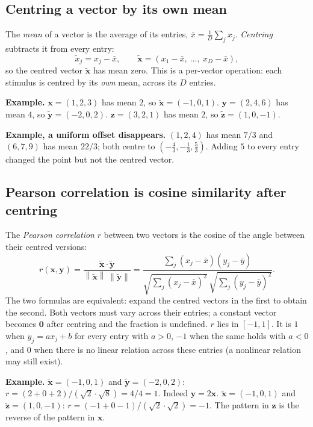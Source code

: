 \documentclass[11pt]{article}
\newcommand{\vx}{\bm{x}}
\newcommand{\vy}{\bm{y}}
\newcommand{\norm}[1]{\left\lVert #1 \right\rVert}
\begin{document}
\subsection{Centring a vector by its own mean}

The \emph{mean} of a vector is the average of its entries, $\bar{x} = \frac{1}{D}\sum_j x_j$.
\emph{Centring} subtracts it from every entry:
\[
\tilde{x}_j = x_j - \bar{x}, \qquad
\tilde{\vx} = (x_1 - \bar{x},\ \dots,\ x_D - \bar{x}) ,
\]
so the centred vector $\tilde{\vx}$ has mean zero. This is a per-vector operation: each
stimulus is centred by its \emph{own} mean, across its $D$ entries.

\textbf{Example.} $\vx = (1, 2, 3)$ has mean $2$, so $\tilde{\vx} = (-1, 0, 1)$.
$\vy = (2, 4, 6)$ has mean $4$, so $\tilde{\vy} = (-2, 0, 2)$.
$\bm{z} = (3, 2, 1)$ has mean $2$, so $\tilde{\bm{z}} = (1, 0, -1)$.

\textbf{Example, a uniform offset disappears.} $(1, 2, 4)$ has mean $7/3$ and
$(6, 7, 9)$ has mean $22/3$; both centre to $(-\tfrac43, -\tfrac13, \tfrac53)$. Adding
$5$ to every entry changed the point but not the centred vector.

\subsection{Pearson correlation is cosine similarity after centring}

The \emph{Pearson correlation} $r$ between two vectors is the cosine of the angle between
their centred versions:
\[
r(\vx, \vy) = \frac{\tilde{\vx} \cdot \tilde{\vy}}{\norm{\tilde{\vx}}\,\norm{\tilde{\vy}}}
= \frac{\sum_j (x_j - \bar{x})(y_j - \bar{y})}
       {\sqrt{\sum_j (x_j - \bar{x})^2}\,\sqrt{\sum_j (y_j - \bar{y})^2}} .
\]
The two formulas are equivalent: expand the centred vectors in the first to obtain the
second. Both vectors must vary across their entries; a constant vector becomes $\bm{0}$
after centring and the fraction is undefined. $r$ lies in $[-1, 1]$. It is $1$ when
$y_j = a x_j + b$ for every entry with $a > 0$, $-1$ when the same holds with $a < 0$, and
$0$ when there is no linear relation across these entries (a nonlinear relation may still
exist).

\textbf{Example.} $\tilde{\vx} = (-1, 0, 1)$ and $\tilde{\vy} = (-2, 0, 2)$:
$r = (2 + 0 + 2) / (\sqrt{2}\cdot\sqrt{8}) = 4 / 4 = 1$. Indeed $\vy = 2\vx$.
$\tilde{\vx} = (-1, 0, 1)$ and $\tilde{\bm{z}} = (1, 0, -1)$:
$r = (-1 + 0 - 1) / (\sqrt{2}\cdot\sqrt{2}) = -1$. The pattern in $\bm{z}$ is the reverse
of the pattern in $\vx$.
\end{document}
